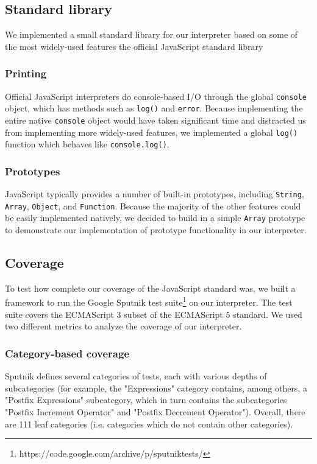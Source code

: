 \documentclass{article}
\begin{document}
\subsection*{Standard library}

We implemented a small standard library for our interpreter based on some of the
most widely-used features the official JavaScript standard library

\subsubsection*{Printing}

Official JavaScript interpreters do console-based I/O through the global
\texttt{console} object, which has methods such as \texttt{log()} and
\texttt{error}. Because implementing the entire native \texttt{console} object
would have taken significant time and distracted us from implementing more
widely-used features, we implemented a global \texttt{log()} function which
behaves like \texttt{console.log()}.

\subsubsection*{Prototypes}

JavaScript typically provides a number of built-in prototypes, including
\texttt{String}, \texttt{Array}, \texttt{Object}, and \texttt{Function}. Because
the majority of the other features could be easily implemented natively, we
decided to build in a simple \texttt{Array} prototype to demonstrate our
implementation of prototype functionality in our interpreter.

\subsection*{Coverage}

To test how complete our coverage of the JavaScript standard was, we built a
framework to run the Google Sputnik test
suite\footnote{https://code.google.com/archive/p/sputniktests/} on our
interpreter. The test suite covers the ECMAScript 3 subset of the ECMAScript 5
standard. We used two different metrics to analyze the coverage of our
interpreter.

\subsubsection*{Category-based coverage}

Sputnik defines several categories of tests, each with various depths of subcategories
(for example, the "Expressions" category contains, among others, a "Postfix
Expressions" subcategory, which in turn contains the subcategories "Postfix
Increment Operator" and "Postfix Decrement Operator"). Overall, there are 111
leaf categories (i.e. categories which do not contain other categories). \newline
\end{document}
